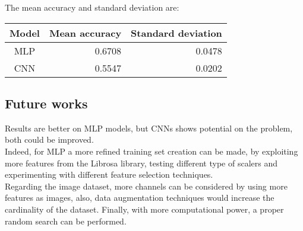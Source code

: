 The mean accuracy and standard deviation are: 
\begin{center}
    \begin{tabular}{ |c|r|r| } 
        \hline
        Model & Mean accuracy & Standard deviation\\
        \hline
        MLP & 0.6708 & 0.0478 \\
        CNN & 0.5547 & 0.0202 \\
        \hline
    \end{tabular}
\end{center}

\subsection{Future works}

Results are better on MLP models, but CNNs
shows potential on the problem, both could be improved.\\ 
Indeed, for MLP a more refined training set creation can be made, by exploiting 
more features from the Librosa library, testing different type 
of scalers and experimenting with different feature selection 
techniques.\\
Regarding the image dataset, more channels can be considered 
by using more features as images, also, data augmentation techniques 
would increase the cardinality of the dataset.
Finally, with more computational power, a proper random search can be performed.
